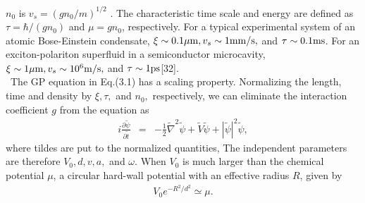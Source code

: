 \documentclass[12pt,a4paper]{report} %
\begin{document}
$n_0$ is $v_s =(g n_0 / m)^{1/2}$ . The characteristic time scale and energy are
defined as $\tau = \hbar/(g n_0)$ and $\mu = g n_0$, respectively.
For a typical experimental system of an atomic Bose-Einstein condensate, $\xi \sim 0.1 {\rm \mu m},
v_s \sim 1 {\rm mm/s},$ and $\tau \sim 0.1 {\rm ms}$. For an exciton-polariton
superfluid in a semiconductor microcavity, $\xi \sim 1 {\rm \mu m}, v_s \sim 10^6 {\rm m/s},$
and $\tau \sim 1 {\rm ps}$[32].
\\
\ The GP equation in Eq.(3.1) has a scaling property. Normalizing the length, time and density 
by $\xi,\tau,$ and $n_0,$ respectively, we can eliminate the interaction coefficient $g$
from the equation as 
\begin{eqnarray}
i \frac{\partial \tilde{\psi}}{\partial \tilde{t}}
& = & -\frac{1}{2} \tilde{\nabla}^2 \tilde{\psi} + \tilde{V} \tilde{\psi} + |\tilde{\psi}|^2 \tilde{\psi},
\end{eqnarray}
where tildes are put to the normalized quantities, The independent parameters are therefore
$V_0, d, v, a,$ and $\omega$.
When $V_0$ is much larger than the chemical potential $\mu$, a circular hard-wall potential
with an effective radius $R$, given by
\begin{eqnarray}
V_0 e^{-R^2/d^2} \simeq \mu.
\end{eqnarray}
\end{document}
